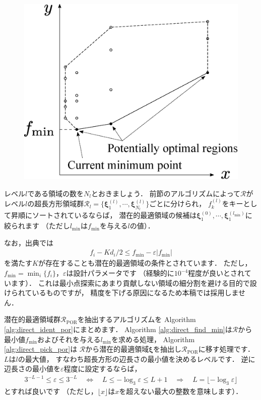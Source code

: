 ﻿\documentclass{jsarticle}
\begin{document}
\begin{figure}[h]
\begin{center}
\includegraphics[height=.25\textheight]{fig/DIRECT_POR.eps}
\end{center}
\end{figure}

レベル$l$である領域の数を$N_{l}$とおきましょう．
前節のアルゴリズムによって$\mathcal{R}$が
レベル$l$の超長方形領域群$\mathcal{R}_{l}=\{\bm{\xi}^{(l)}_{1},\cdots,\bm{\xi}^{(l)}_{N_{l}}\}$ごとに分けられ，
$f^{(l)}_{k}$をキーとして昇順にソートされているならば，
潜在的最適領域の候補は$\bm{\xi}^{(0)}_{1},\cdots,\bm{\xi}^{(l_{\mathrm{min}})}_{1}$に絞られます
（ただし$l_{\mathrm{min}}$は$f_{\mathrm{min}}$を与える$l$の値）．

なお，出典では
\begin{align*}
f_{i}-K d_{i}/2 \leq f_{\mathrm{min}}-\varepsilon\left|f_{\mathrm{min}}\right|
\end{align*}
を満たす$K$が存在することも潜在的最適領域の条件とされています．
ただし，$f_{\mathrm{min}}=\min_{i}\{f_{i}\}$，$\varepsilon$は設計パラメータです
（経験的に$10^{-4}$程度が良いとされています）．
これは最小点探索にあまり貢献しない領域の細分割を避ける目的で設けられているものですが，
精度を下げる原因になるため本稿では採用しません．

潜在的最適領域群$\mathcal{R}_{\mathrm{POR}}$を抽出するアルゴリズムを
Algorithm \ref{alg:direct_ident_por}にまとめます．
Algorithm \ref{alg:direct_find_min}は$\mathcal{R}$から最小値$f_{\mathrm{min}}$およびそれを与える$l_{\mathrm{min}}$を求める処理，
Algorithm \ref{alg:direct_pick_por}は
$\mathcal{R}$から潜在的最適領域$\bm{\xi}$を抽出し$\mathcal{R}_{\mathrm{POR}}$に移す処理です．
$L$は$l$の最大値，
すなわち超長方形の辺長さの最小値を決めるレベルです．
逆に辺長さの最小値を$\varepsilon$程度に設定するならば，
\begin{align*}
3^{-L-1}\leq \varepsilon\leq 3^{-L}
\quad\Leftrightarrow\quad
L\leq -\log_{3}\varepsilon\leq L+1
\quad\Rightarrow\quad
L=\lfloor -\log_{3}\varepsilon\rfloor
\end{align*}
とすれば良いです
（ただし，$\lfloor x \rfloor$は$x$を超えない最大の整数を意味します）．
\end{document}
